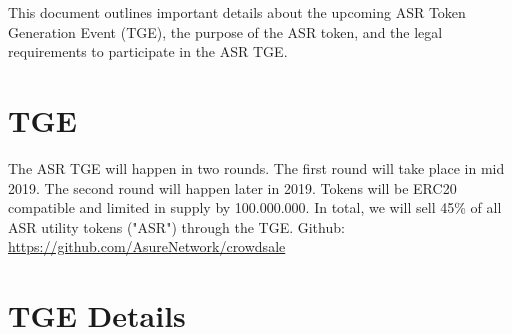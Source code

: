 
This document outlines important details about the upcoming ASR Token Generation Event (TGE), the purpose of the ASR token, and the legal requirements to participate in the ASR TGE.

\section{TGE}
The ASR TGE will happen in two rounds. The first round will take place in mid 2019. The second round will happen later in 2019. Tokens will be ERC20 compatible and limited in supply by 100.000.000. In total, we will sell 45\% of all ASR utility tokens ("ASR") through the TGE.
\newline\newline
Github: \url{https://github.com/AsureNetwork/crowdsale}

\newpage

\section{TGE Details}


